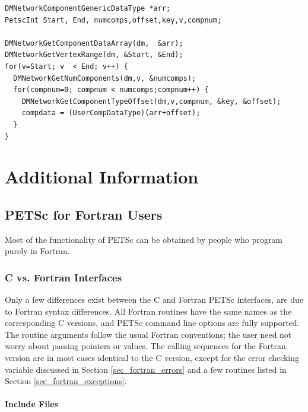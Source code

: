 {\begin{lstlisting}
DMNetworkComponentGenericDataType *arr; 
PetscInt Start, End, numcomps,offset,key,v,compnum; 

DMNetworkGetComponentDataArray(dm,  &arr); 
DMNetworkGetVertexRange(dm, &Start, &End); 
for(v=Start; v  < End; v++) { 
  DMNetworkGetNumComponents(dm,v, &numcomps); 
  for(compnum=0; compnum < numcomps;compnum++) {
    DMNetworkGetComponentTypeOffset(dm,v,compnum, &key, &offset); 
    compdata = (UserCompDataType)(arr+offset); 
  }
}
\end{lstlisting}

\cleardoublepage
\part{Additional Information}
\label{part_usefulstuff}

\cleardoublepage
\chapter{PETSc for Fortran Users}
\label{ch_fortran}

Most of the functionality of PETSc can be obtained by people who
program purely in Fortran.

\section{C vs. Fortran Interfaces}

Only a few differences exist between the C and Fortran PETSc
interfaces, are due to Fortran syntax differences.
All Fortran routines have the same names as the corresponding C
versions, and PETSc command line options are fully supported. The
routine arguments follow the usual Fortran conventions; the user need
not worry about passing pointers or values.  The calling sequences
for the Fortran version are in most cases identical to the C version,
except for the error checking variable discussed in
Section \ref{sec_fortran_errors} and a few routines listed in
Section \ref{sec_fortran_exceptions}.

\subsection{Include Files}
\label{sec_fortran_includes}

}
